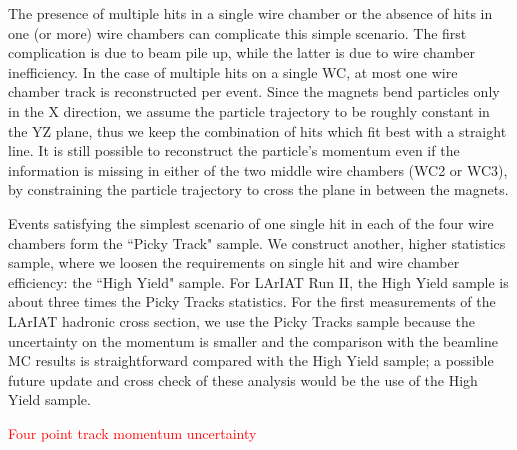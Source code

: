 The presence of multiple hits in a single wire chamber or the absence of hits in one (or more) wire chambers can complicate this simple scenario. The first complication is due to beam pile up, while the latter is due to wire chamber inefficiency. In the case of multiple hits on a single WC, at most one wire chamber track is reconstructed per event. Since the magnets bend particles only in the X direction, we assume the particle trajectory to be roughly constant in the YZ plane, thus we keep the combination of hits which fit best with a straight line. 
It is still possible to reconstruct the particle's momentum  even if the information is missing in either of the two middle wire chambers (WC2 or WC3), by constraining the particle trajectory to cross the plane in between the magnets. 

Events satisfying the simplest scenario of one single hit in each of the four wire chambers form the ``Picky Track" sample.  We construct another, higher statistics sample, where we loosen the requirements on single hit and wire chamber efficiency: the ``High Yield" sample. For LArIAT Run II, the High Yield sample is about three times the Picky Tracks statistics.  For the first measurements of the LArIAT hadronic cross section, we use the Picky Tracks sample because the uncertainty on the momentum is smaller and the comparison with the beamline MC results is straightforward compared with the High Yield sample;  a possible future update and cross check of these analysis would be the use of the High Yield sample. 


\textcolor{red}{Four point track momentum uncertainty}

